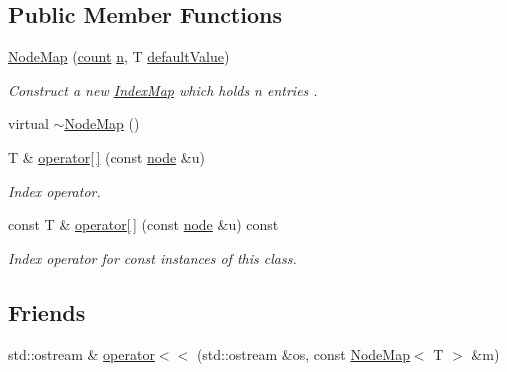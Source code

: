 \subsection*{Public Member Functions}
\begin{DoxyCompactItemize}
\item 
\hyperlink{class_networ_kit_1_1_node_map_a6ad9a0cdbe412f6f9b39e37ecc1a84bd}{Node\-Map} (\hyperlink{namespace_networ_kit_a76b399edfa50ae72e4aa86007aaa800a}{count} \hyperlink{class_networ_kit_1_1_index_map_abffdb945755f2789f33b5eb6e95430d8}{n}, T \hyperlink{class_networ_kit_1_1_index_map_aa7b9e890a78e37f9e1fd1978b3706c4c}{default\-Value})
\begin{DoxyCompactList}\small\item\em Construct a new \hyperlink{class_networ_kit_1_1_index_map}{Index\-Map} which holds n entries . \end{DoxyCompactList}\item 
virtual \hyperlink{class_networ_kit_1_1_node_map_acf773edc98e3fd7bc759e46cb937159d}{$\sim$\-Node\-Map} ()
\item 
T \& \hyperlink{class_networ_kit_1_1_node_map_a66e3e9d575a8ddba4b511487af3e8eaf}{operator\mbox{[}$\,$\mbox{]}} (const \hyperlink{namespace_networ_kit_a53fe3e4fd04ea024160e4d024dfebadf}{node} \&u)
\begin{DoxyCompactList}\small\item\em Index operator. \end{DoxyCompactList}\item 
const T \& \hyperlink{class_networ_kit_1_1_node_map_a9634f8c3e6d6673cab004574988c5fba}{operator\mbox{[}$\,$\mbox{]}} (const \hyperlink{namespace_networ_kit_a53fe3e4fd04ea024160e4d024dfebadf}{node} \&u) const 
\begin{DoxyCompactList}\small\item\em Index operator for const instances of this class. \end{DoxyCompactList}\end{DoxyCompactItemize}
\subsection*{Friends}
\begin{DoxyCompactItemize}
\item 
std\-::ostream \& \hyperlink{class_networ_kit_1_1_node_map_a04c08e83d9f515f810401ff16ed5f745}{operator$<$$<$} (std\-::ostream \&os, const \hyperlink{class_networ_kit_1_1_node_map}{Node\-Map}$<$ T $>$ \&m)
\end{DoxyCompactItemize}

